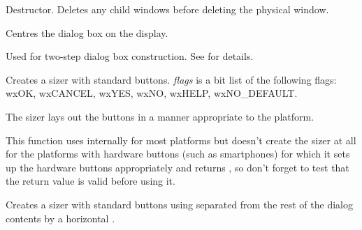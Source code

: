 
Destructor. Deletes any child windows before deleting the physical window.


\label{wxdialogcentre}


Centres the dialog box on the display.




\label{wxdialogcreate}


Used for two-step dialog box construction. See \rtfsp
for details.


\label{wxdialogcreatebuttonsizer}


Creates a sizer with standard buttons. {\it flags} is a bit list
of the following flags: wxOK, wxCANCEL, wxYES, wxNO, wxHELP, wxNO\_DEFAULT.

The sizer lays out the buttons in a manner appropriate to the platform.

This function uses  
internally for most platforms but doesn't create the sizer at all for the
platforms with hardware buttons (such as smartphones) for which it sets up the
hardware buttons appropriately and returns \NULL, so don't forget to test that
the return value is valid before using it.


\label{wxdialogcreateseparatedbuttonsizer}


Creates a sizer with standard buttons using 
 separated from the rest
of the dialog contents by a horizontal .

